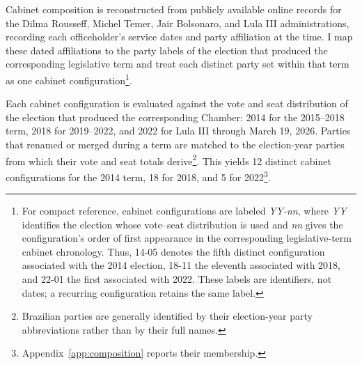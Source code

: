 \documentclass[11pt]{article}
\begin{document}
Cabinet composition is reconstructed from publicly available online records for
the Dilma Rousseff, Michel Temer, Jair Bolsonaro, and Lula III administrations,
recording each officeholder's service dates and party affiliation at the time. I
map these dated affiliations to the party labels of the election that produced
the corresponding legislative term and treat each distinct party set within that
term as one cabinet configuration\footnote{For compact reference, cabinet
configurations are labeled \textit{YY-nn}, where \textit{YY} identifies the
election whose vote--seat distribution is used and \textit{nn} gives the
configuration's order of first appearance in the corresponding legislative-term
cabinet chronology. Thus, 14-05 denotes the fifth distinct configuration
associated with the 2014 election, 18-11 the eleventh associated with 2018, and
22-01 the first associated with 2022. These labels are identifiers, not dates;
a recurring configuration retains the same label.}.

Each cabinet configuration is evaluated against the vote and seat distribution
of the election that produced the corresponding Chamber: 2014 for the
2015--2018 term, 2018 for 2019--2022, and 2022 for Lula III through March
19, 2026. Parties that renamed or merged during a term are matched to the
election-year parties from which their vote and seat totals derive\footnote{
Brazilian parties are generally identified by their election-year party
abbreviations rather than by their full names.}. This yields
12 distinct cabinet configurations for the 2014 term, 18 for 2018, and 5 for
2022\footnote{Appendix~\ref{app:composition} reports their membership.}.

\end{document}
